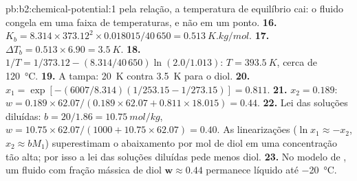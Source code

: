 \begin{solution}{pb:b2:chemical-potential:1}
pela relação, a temperatura de equilíbrio cai: o fluido congela em uma faixa
de temperaturas, e não em um ponto.
\textbf{16.} $K_b = 8.314 \times 373.12^2 \times 0.018015/40\,650 =
\qty{0.513}{K.kg/mol}$.
\textbf{17.} $\Delta T_b = 0.513 \times 6.90 = \qty{3.5}{K}$.
\textbf{18.} $1/T = 1/373.12 - (8.314/40\,650)\ln(2.0/1.013)$: $T = \qty{393.5}{K}$,
cerca de \qty{120}{\celsius}.
\textbf{19.} A tampa: \qty{20}{K} contra \qty{3.5}{K} para o diol.
\textbf{20.} $x_1 = \exp[-(6007/8.314)(1/253.15 - 1/273.15)] = 0.811$.
\textbf{21.} $x_2 = 0.189$: $w = 0.189 \times 62.07/(0.189 \times 62.07 + 0.811
\times 18.015) = 0.44$.
\textbf{22.} Lei das soluções diluídas: $b = 20/1.86 = \qty{10.75}{mol/kg}$, $w = 10.75 \times
62.07/(1000 + 10.75 \times 62.07) = 0.40$. As linearizações ($\ln x_1 \approx
-x_2$, $x_2 \approx bM_1$) superestimam o abaixamento por mol de diol em uma
concentração tão alta; por isso a lei das soluções diluídas pede menos diol.
\textbf{23.} No modelo de , um fluido com fração mássica de
diol $\boldsymbol{w \approx 0.44}$ permanece líquido até \qty{-20}{\celsius}.
\end{solution}
